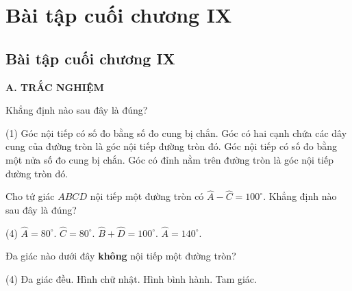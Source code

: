 %

\section*{Bài tập cuối chương IX}

\begin{exercises}
    \subsection{Bài tập cuối chương IX}

    \textbf{A. TRẮC NGHIỆM}

    \begin{questions}[resume=SGK]
        \item Khẳng định nào sau đây là đúng?
        \begin{tasks}(1)
            \task Góc nội tiếp có số đo bằng số đo cung bị chắn.
            \task Góc có hai cạnh chứa các dây cung của đường tròn là góc nội tiếp đường tròn đó.
            \task Góc nội tiếp có số đo bằng một nửa số đo cung bị chắn.
            \task Góc có đỉnh nằm trên đường tròn là góc nội tiếp đường tròn đó.
        \end{tasks}
        \par\noindent\answerbox\par

        \item Cho tứ giác $ABCD$ nội tiếp một đường tròn có $\widehat{A}-\widehat{C}=100^\circ$. Khẳng định nào sau đây là đúng?
        \begin{tasks}(4)
            \task $\widehat{A}=80^\circ$.
            \task $\widehat{C}=80^\circ$.
            \task $\widehat{B}+\widehat{D}=100^\circ$.
            \task $\widehat{A}=140^\circ$.
        \end{tasks}
        \par\noindent\answerbox\par

        \item Đa giác nào dưới đây \textbf{không} nội tiếp một đường tròn?
        \begin{tasks}(4)
            \task Đa giác đều.
            \task Hình chữ nhật.
            \task Hình bình hành.
            \task Tam giác.
        \end{tasks}
        \par\noindent\answerbox\par
    \end{questions}


\end{exercises}
